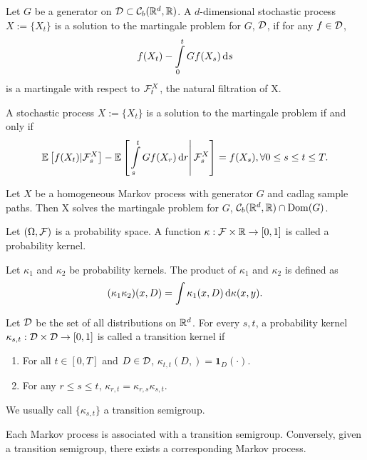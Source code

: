 \begin{definition}
  Let $G$ be a generator on $\mathcal{D}\subset\mathcal{C}_b(\mathbb{R}^d, \mathbb{R})$. A $d$-dimensional stochastic process $X:=\{X_t\}$ is a solution to the martingale problem for $G$, $\mathcal{D}$, if for any $f\in \mathcal{D}$,
  \begin{equation}
    f(X_t) - \int\limits_0^t Gf(X_s)\,\mathrm{d} s
  \end{equation}
  is a martingale with respect to ${\mathcal{F}^X_t}$, the natural filtration of X.
\end{definition}

\begin{lemma}
  A stochastic process $X:=\{X_t\}$ is a solution to the martingale problem if and only if
  \begin{equation}
    \mathbb{E}\left[f(X_t)|\mathcal{F}^X_s\right] - \mathbb{E}\left[\left.\int\limits_{s}^t Gf(X_r)\,\mathrm{d} r \right| \mathcal{F}^X_s\right] = f(X_s), \forall 0\le s\le t\le T.
  \end{equation}
\end{lemma}


\begin{theorem}
  Let $X$ be a homogeneous Markov process with generator $G$ and cadlag sample paths. Then X solves the martingale problem for $G$, $\mathcal{C}_b(\mathbb{R}^d, \mathbb{R})\cap \mathrm{Dom}(G)$.
\end{theorem}

\begin{definition}
  Let $(\Omega, \mathcal{F})$ is a probability space. A function $\kappa: \mathcal{F} \times \mathbb{R} \to [0,1]$ is called a probability kernel.
\end{definition}

\begin{definition}
  Let $\kappa_1$ and $\kappa_2$ be probability kernels. The product of $\kappa_1$ and $\kappa_2$ is defined as
  \begin{equation}
    (\kappa_1\kappa_2)(x, D) = \int\kappa_1(x, D)\,\mathrm{d}\kappa(x, y).
  \end{equation}
\end{definition}

\begin{definition}
  Let $\mathcal{D}$ be the set of all distributions on $\mathbb{R}^d$. For every $s,t$, a probability kernel $\kappa_{s,t} : \mathcal{D} \times \mathcal{D} \to [0,1]$ is called a transition kernel if
  \begin{enumerate}[label = (\roman*)]
    \item For all $t\in[0,T]$ and $D\in\mathcal{D}$, $\kappa_{t,t}(D, ) = \mathbf{1}_{D}(\cdot)$.
    \item For any $r\le s\le t$, $\kappa_{r,t}=  \kappa_{r,s}\kappa_{s,t}$.
  \end{enumerate}
  We usually call $\{\kappa_{s,t}\}$ a transition semigroup.
\end{definition}

Each Markov process is associated with a transition semigroup. Conversely, given a transition semigroup, there exists a corresponding Markov process.

